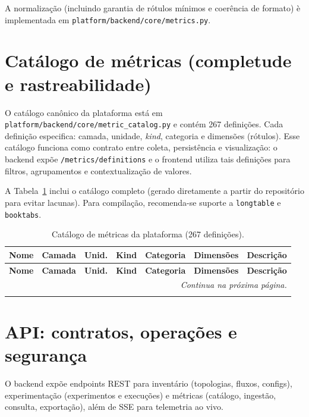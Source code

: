 \documentclass[12pt,oneside]{report}
\begin{document}
A normaliza\c{c}\~ao (incluindo garantia de r\'otulos m\'inimos e coer\^encia de formato) \`e implementada em \texttt{platform/backend/core/metrics.py}.

\section{Cat\'alogo de m\'etricas (completude e rastreabilidade)}
O cat\'alogo can\^onico da plataforma est\'a em \texttt{platform/backend/core/metric\_catalog.py} e cont\'em 267 defini\c{c}\~oes. Cada defini\c{c}\~ao especifica: camada, unidade, \textit{kind}, categoria e dimens\~oes (r\'otulos). Esse cat\'alogo funciona como contrato entre coleta, persist\^encia e visualiza\c{c}\~ao: o backend exp\~oe \texttt{/metrics/definitions} e o frontend utiliza tais defini\c{c}\~oes para filtros, agrupamentos e contextualiza\c{c}\~ao de valores.

A Tabela~\ref{tab:metric-catalog} inclui o cat\'alogo completo (gerado diretamente a partir do reposit\'orio para evitar lacunas). Para compila\c{c}\~ao, recomenda-se suporte a \texttt{longtable} e \texttt{booktabs}.

\begingroup
\footnotesize
\setlength{\tabcolsep}{4pt}
\renewcommand{\arraystretch}{1.08}
\begin{longtable}{p{}p{}p{}p{}p{}p{}p{}}
\caption{Cat\'alogo de m\'etricas da plataforma (267 defini\c{c}\~oes).}\label{tab:metric-catalog}\\
\toprule
\textbf{Nome} & \textbf{Camada} & \textbf{Unid.} & \textbf{Kind} & \textbf{Categoria} & \textbf{Dimens\~oes} & \textbf{Descri\c{c}\~ao}\\
\midrule
\endfirsthead
\toprule
\textbf{Nome} & \textbf{Camada} & \textbf{Unid.} & \textbf{Kind} & \textbf{Categoria} & \textbf{Dimens\~oes} & \textbf{Descri\c{c}\~ao}\\
\midrule
\endhead
\midrule
\multicolumn{7}{r}{\footnotesize\emph{Continua na pr\'oxima p\'agina.}}\\
\endfoot
\bottomrule
\endlastfoot

\end{longtable}
\endgroup

\section{API: contratos, opera\c{c}\~oes e seguran\c{c}a}
O backend exp\~oe endpoints REST para invent\'ario (topologias, fluxos, configs), experimenta\c{c}\~ao (experimentos e execu\c{c}\~oes) e m\'etricas (cat\'alogo, ingest\~ao, consulta, exporta\c{c}\~ao), al\'em de SSE para telemetria ao vivo.
\end{document}
